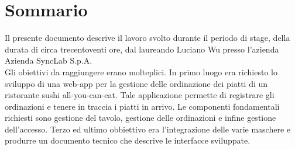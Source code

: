 
\cleardoublepage
{}
{}
\begingroup
\let\clearpage\relax
\let\cleardoublepage\relax
\let\cleardoublepage\relax

\chapter*{Sommario}

Il presente documento descrive il lavoro svolto durante il periodo di stage, della durata di circa trecentoventi ore, dal laureando Luciano Wu presso l'azienda Azienda SyncLab S.p.A.\\
Gli obiettivi da raggiungere erano molteplici. In primo luogo era richiesto lo sviluppo di una web-app per la gestione delle ordinazione dei piatti di un ristorante sushi all-you-can-eat.
Tale applicazione permette di registrare gli ordinazioni e tenere in traccia i piatti in arrivo.
Le componenti fondamentali richiesti sono gestione del tavolo, gestione delle ordinazioni e infine gestione dell'accesso.
Terzo ed ultimo obbiettivo era l'integrazione delle varie maschere e produrre un documento tecnico che descrive le interfacce sviluppate.
%
%

\endgroup			

\vfill

